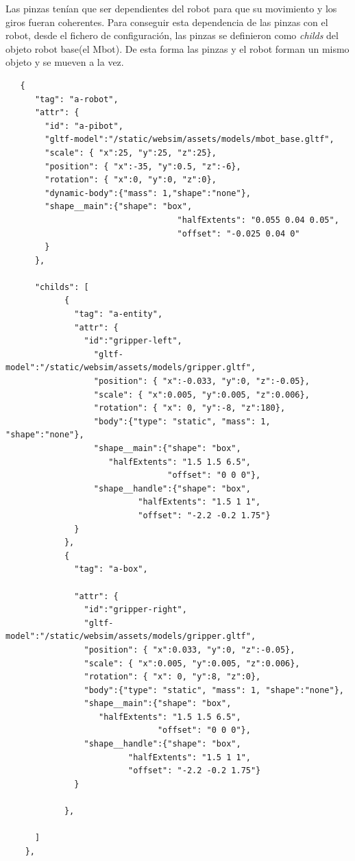 Las pinzas tenían que ser dependientes del robot para que su movimiento y los giros fueran coherentes. 
Para conseguir esta dependencia de las pinzas con el robot, desde el fichero de configuración, las pinzas se definieron como \textit{childs} del objeto robot base(el Mbot). De esta forma las pinzas y el robot forman un mismo objeto y se mueven a la vez.

\begin{lstlisting}
   {
      "tag": "a-robot",
      "attr": {
        "id": "a-pibot",
        "gltf-model":"/static/websim/assets/models/mbot_base.gltf",
        "scale": { "x":25, "y":25, "z":25},
        "position": { "x":-35, "y":0.5, "z":-6},
        "rotation": { "x":0, "y":0, "z":0},
        "dynamic-body":{"mass": 1,"shape":"none"},
        "shape__main":{"shape": "box",
                                   "halfExtents": "0.055 0.04 0.05",
                                   "offset": "-0.025 0.04 0"
        }
      },
      
      "childs": [
            {
              "tag": "a-entity",
              "attr": {
                "id":"gripper-left",
		          "gltf-model":"/static/websim/assets/models/gripper.gltf",
                  "position": { "x":-0.033, "y":0, "z":-0.05},
                  "scale": { "x":0.005, "y":0.005, "z":0.006},
                  "rotation": { "x": 0, "y":-8, "z":180},
                  "body":{"type": "static", "mass": 1, "shape":"none"},
                  "shape__main":{"shape": "box",
                     "halfExtents": "1.5 1.5 6.5",
                                 "offset": "0 0 0"},
                  "shape__handle":{"shape": "box",
                           "halfExtents": "1.5 1 1",
                           "offset": "-2.2 -0.2 1.75"}
              }
            },
            {
              "tag": "a-box",

              "attr": {
                "id":"gripper-right",
		        "gltf-model":"/static/websim/assets/models/gripper.gltf",
                "position": { "x":0.033, "y":0, "z":-0.05},
                "scale": { "x":0.005, "y":0.005, "z":0.006},
                "rotation": { "x": 0, "y":8, "z":0},
                "body":{"type": "static", "mass": 1, "shape":"none"},
                "shape__main":{"shape": "box",
			       "halfExtents": "1.5 1.5 6.5",
                               "offset": "0 0 0"},
		        "shape__handle":{"shape": "box",
                         "halfExtents": "1.5 1 1",
                         "offset": "-2.2 -0.2 1.75"}
              }
              
            },
         
      ]
    },
    
\end{lstlisting}

